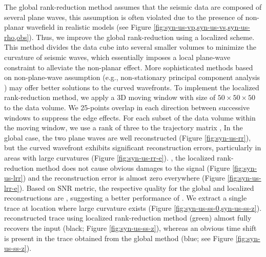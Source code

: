 The global rank-reduction method assumes that the seismic data are composed of several plane waves,  this assumption is often violated due to the presence of  non-planar wavefield in realistic models (see Figure \ref{fig:syn-us-vp,syn-us-vs,syn-us-rho,obs}). Thus, we improve the global rank-reduction  using a localized scheme. This method divides the data cube into several smaller volumes to minimize the curvature of seismic waves, which essentially imposes a local plane-wave constraint to alleviate the non-planar effect.  More sophisticated methods based on non-plane-wave assumption (e.g.,  non-stationary principal component analysis \cite[]{zhao2016principal}) may offer better solutions to the curved wavefronts. To implement the localized rank-reduction method, we apply a 3D moving window with  size of $50\times 50\times 50$ to the data volume. We   25-points  overlap in each direction between successive windows to suppress the edge effects. For each subset of the data volume within the moving window, we use a  rank of three to  the trajectory matrix ,   In the global case, the two plane waves are well reconstructed (Figure \ref{fig:syn-us-rr}), but the curved wavefront exhibits significant reconstruction errors, particularly in areas with large curvatures (Figure \ref{fig:syn-us-rr-e}). , the localized rank-reduction method does not cause obvious damages to the signal (Figure \ref{fig:syn-us-lrr}) and the reconstruction error is almost zero everywhere (Figure \ref{fig:syn-us-lrr-e}). Based on SNR metric, the respective quality  for the global and localized reconstructions are , suggesting a better performance of . We extract a single trace at  location where large curvature exists (Figure \ref{fig:syn-us-ss-0,syn-us-ss-z}).  reconstructed trace using localized rank-reduction method (green) almost fully recovers the input (black; Figure \ref{fig:syn-us-ss-z}), whereas an obvious time shift is present in the trace obtained from the global method (blue; see Figure \ref{fig:syn-us-ss-z}).

